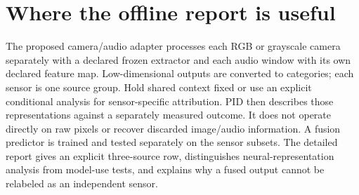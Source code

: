 \documentclass[11pt,a4paper]{article}
\begin{document}
\section{Where the offline report is useful}\label{where-the-offline-report-is-useful}

The proposed camera/audio adapter processes each RGB or grayscale camera separately with a declared frozen extractor and each audio window with its own declared feature map. Low-dimensional outputs are converted to categories; each sensor is one source group. Hold shared context fixed or use an explicit conditional analysis for sensor-specific attribution. PID then describes those representations against a separately measured outcome. It does not operate directly on raw pixels or recover discarded image/audio information. A fusion predictor is trained and tested separately on the sensor subsets. The detailed report gives an explicit three-source row, distinguishes neural-representation analysis from model-use tests, and explains why a fused output cannot be relabeled as an independent sensor.
\end{document}

